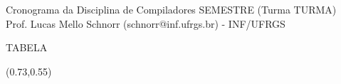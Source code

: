 \documentclass[11pt,portuguese,]{article}
\begin{document}
\begin{center}
  {\Large Cronograma da Disciplina de Compiladores SEMESTRE (Turma TURMA)} \\
  Prof. Lucas Mello Schnorr (schnorr@inf.ufrgs.br) - INF/UFRGS
\end{center}

\begin{adjustbox}{width=.8\textwidth,left}
  TABELA
\end{adjustbox}
\begin{textblock}{1.75}(0.73,0.55)
\end{textblock}
\end{document}
